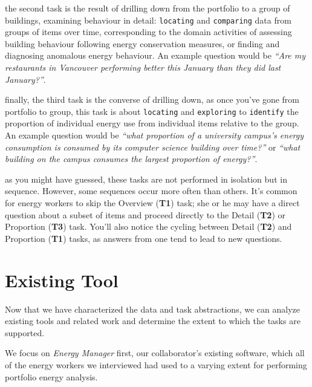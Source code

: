 \documentclass[journal]{vgtc}                %
\newcommand{\bstart}[1]{\vspace{1mm} \noindent{\textbf{#1:}}}
\begin{document}
\bstart{T2 / Detail} the second task is the result of drilling down from the portfolio to a group of buildings, examining behaviour in detail: {\tt locating} and {\tt comparing} data from groups of items over time, corresponding to the domain activities of assessing building behaviour following energy conservation measures, or finding and diagnosing anomalous energy behaviour. 
An example question would be {\it ``Are my restaurants in Vancouver performing better this January than they did last January?''}.

\bstart{T3 / Proportion} finally, the third task is the converse of drilling down, as once you've gone from portfolio to group, this task is about {\tt locating} and {\tt exploring} to {\tt identify} the proportion of individual energy use from individual items relative to the group.
An example question would be {\it ``what proportion of a university campus's energy consumption is consumed by its computer science building over time?''} or {\it ``what building on the campus consumes the largest proportion of energy?''}.

\bstart{Task sequences} as you might have guessed, these tasks are not performed in isolation but in sequence. 
However, some sequences occur more often than others. 
It's common for energy workers to skip the Overview ({\bf T1}) task; she or he may have a direct question about a subset of items and proceed directly to the Detail ({\bf T2}) or Proportion ({\bf T3}) task. 
You'll also notice the cycling between Detail ({\bf T2}) and Proportion ({\bf T1}) tasks, as answers from one tend to lead to new questions.


\section{Existing Tool}
\label{existing-tool}


Now that we have characterized the data and task abstractions, we can analyze existing tools and related work and determine the extent to which the tasks are supported.


We focus on {\it Energy Manager} first, our collaborator's existing software, which all of the energy workers we interviewed had used to a varying extent for performing portfolio energy analysis.
\end{document}

